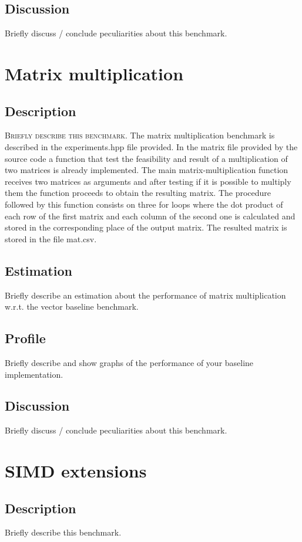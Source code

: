 \documentclass[twocolumn]{article}
\begin{document}
\subsection{Discussion}
Briefly discuss / conclude peculiarities about this benchmark.

\section{Matrix multiplication}
\subsection{Description}
\textsc{Briefly describe this benchmark.}
The matrix multiplication benchmark is described in the experiments.hpp file provided. 
In the matrix file provided by the source code a function that test the feasibility and result of a multiplication of two matrices is already implemented.
The main matrix-multiplication function  receives two matrices as arguments and after testing if it is possible to multiply them  the function proceeds to obtain the resulting matrix.
The procedure  followed by this function consists on three for loops where the dot product of each row of the first matrix and each column of the second one is calculated and stored in the corresponding  place of the output matrix.
The resulted matrix is stored in the file mat.csv.

\subsection{Estimation}

Briefly describe an estimation about the performance of matrix multiplication w.r.t. the vector baseline benchmark.
\subsection{Profile}
Briefly describe and show graphs of the performance of your baseline implementation.
\subsection{Discussion}
Briefly discuss / conclude peculiarities about this benchmark.

\section{SIMD extensions}
\subsection{Description}
Briefly describe this benchmark.
\end{document}
